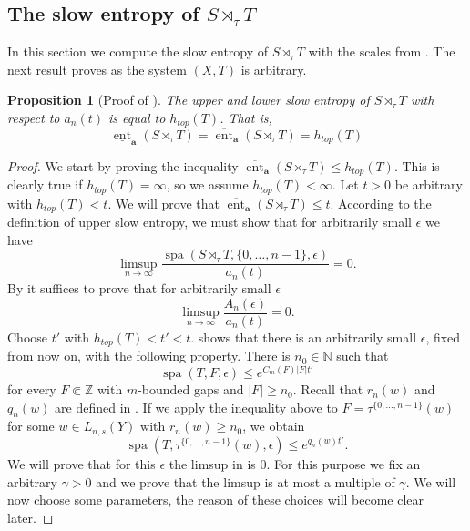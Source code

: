 \documentclass[a4paper,oneside]{amsart}
\renewcommand{\(}{\begin{dmath*}}
\renewcommand{\)}{\end{dmath*}}
\newtheorem{proposition}[theorem]{Proposition}
\theoremstyle{definition}
\newcommand{\N}{\mathbb{N}}
\newcommand{\Z}{\mathbb{Z}}
\newcommand{\upperent}{\overline{\operatorname{ent}}}
\newcommand{\lowerent}{\underline{\operatorname{ent}}}
\newcommand{\spa}{\operatorname{spa}}
\begin{document}
\subsection{The slow entropy of $S\rtimes_\tau T$}
In this section we compute the slow entropy of $S\rtimes_\tau T$ with the scales from . The next result proves  as the system $(X,T)$ is arbitrary.
\begin{proposition}[Proof of ]\label{prop:entropy}
The upper and lower slow entropy of $S\rtimes_\tau T$ with respect to $a_n(t)$ is equal to $h_{top}(T)$. That is,
\[\lowerent_{\textbf{a}}(S\rtimes_\tau T)=\upperent_{\textbf{a}}(S\rtimes_\tau T)=h_{top}(T)\]
\end{proposition}
\begin{proof}
    We start by proving the inequality $
    \upperent_{\textbf{a}}(S\rtimes_\tau T)\leq h_{top}(T)$. This is clearly true if $h_{top}(T)=\infty$, so we assume $h_{top}(T)<\infty$. Let $t>0$ be arbitrary with $h_{top}(T)<t$. We will prove that $\upperent_{\textbf{a}}(S\rtimes_\tau T)\leq t$. According to the definition of upper slow entropy, we must show that for arbitrarily small $\epsilon$ we have
    \[\limsup_{n\to\infty} \frac{\spa(S\rtimes_\tau T,\{0,\dots,n-1\},\epsilon)}{a_n(t)}=0.\]
    By  it suffices to prove that for arbitrarily small $\epsilon$
    \begin{equation}\label{eq:limsup}\limsup_{n\to\infty} \frac{A_n(\epsilon)}{a_n(t)}=0.\end{equation}
    Choose $t'$ with $h_{top}(T)<t'<t$.  shows that there is an arbitrarily small $\epsilon$, fixed from now on, with the following property. There is $n_0\in\N$ such that \[\spa(T,F,\epsilon)\leq e^{C_m(F)|F|t'}\]
    for every $F\Subset\Z$ with $m$-bounded gaps and $|F|\geq n_0$. Recall that $r_n(w)$ and $q_n(w)$ are defined in . If we apply the inequality above to $F=\tau^{\{0,\dots,n-1\}}(w)$ for some $w\in L_{n,s}(Y)$ with $r_n(w)\geq n_0$, we obtain
    \begin{equation}\label{eq:estimate-1} \spa(T,\tau^{\{0,\dots,n-1\}}(w),\epsilon)\leq e^{q_n(w)t'}.\end{equation}
    We will prove that for this $\epsilon$ the limsup in  is 0. For this purpose we fix an arbitrary $\gamma>0$ and we prove that the limsup is at most a multiple of $\gamma$. We will now choose some parameters, the reason of these choices will become clear later. 
    

\end{proof}
\end{document}
